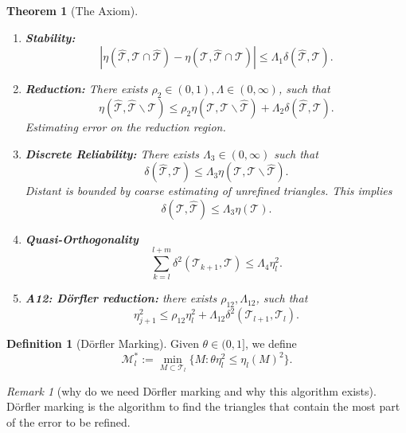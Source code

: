 \documentclass[a4paper,12pt,oneside,fleqn]{book}
\newtheorem{theorem}{Theorem}[section]
\theoremstyle{definition}
\newtheorem{definition}{Definition}[section]
\theoremstyle{remark}
\newtheorem*{remark}{Remark}
\begin{document}
\begin{theorem}[The Axiom]
\quad
\begin{enumerate}
	\item \textbf{Stability:}  
	\begin{equation}
		|\eta(\hat{\mathcal{T}}, \mathcal{T} \cap \hat{\mathcal{T}}) - \eta(\mathcal{T}, \hat{\mathcal{T}} \cap \mathcal{T})| \le \Lambda_1 \delta(\hat{\mathcal{T}}, \mathcal{T}).
	\end{equation}
	\item \textbf{Reduction:} 
	There exists $\rho_2 \in (0, 1), \Lambda \in (0, \infty)$, such that
	\begin{equation}
		\eta(\hat{\mathcal{T}}, \hat{\mathcal{T}} \backslash \mathcal{T}) \le \rho_2 \eta(\mathcal{T}, \mathcal{T} \backslash \hat{\mathcal{T}}) + \Lambda_2 \delta(\hat{\mathcal{T}}, \mathcal{T}). 
	\end{equation}
	Estimating error on the reduction region.  
	\item \textbf{Discrete Reliability:} 
	There exists $\Lambda_3 \in (0, \infty)$ such that
	\begin{equation}
		\delta(\hat{\mathcal{T}}, \mathcal{T}) \le \Lambda_3 \eta(\mathcal{T}, \mathcal{T}\backslash \hat{\mathcal{T}}). 
	\end{equation}
	Distant is bounded by coarse estimating of unrefined triangles. This implies
	\begin{equation}
		\delta(\mathcal{T}, \hat{\mathcal{T}}) \le \Lambda_3 \eta(\mathcal{T}). 
	\end{equation}
	\item \textbf{Quasi-Orthogonality}
	\begin{equation}
		\sum_{k = l}^{l + m} \delta^2(\mathcal{T}_{k + 1}, \mathcal{T}) \le \Lambda_4 \eta_l^2.
	\end{equation}
	\item \textbf{A12: D\"orfler reduction:} there exists $\rho_{12}, \Lambda_{12}$, such that
	\begin{equation}
		\eta_{j +1}^2 \le \rho_{12} \eta_l^2 + \Lambda_{12} \delta^2(\mathcal{T}_{l + 1}, \mathcal{T}_l).
	\end{equation}
\end{enumerate}
\end{theorem}

\begin{definition}[D\"orfler Marking]
	Given $\theta \in (0, 1]$, we define
	\begin{equation}
		\mathcal{M}_l^*:= \min_{M \subset \mathcal{T}_l }\bigg\{M: \theta \eta_l^2 \le \eta_l(M)^2 \bigg\}.
	\end{equation}
\end{definition}
\begin{remark}[why do we need D\"orfler marking and why this algorithm exists]
	D\"orfler marking is the algorithm to find the triangles that contain the most part of the error to be refined. 
\end{remark}
\end{document}
